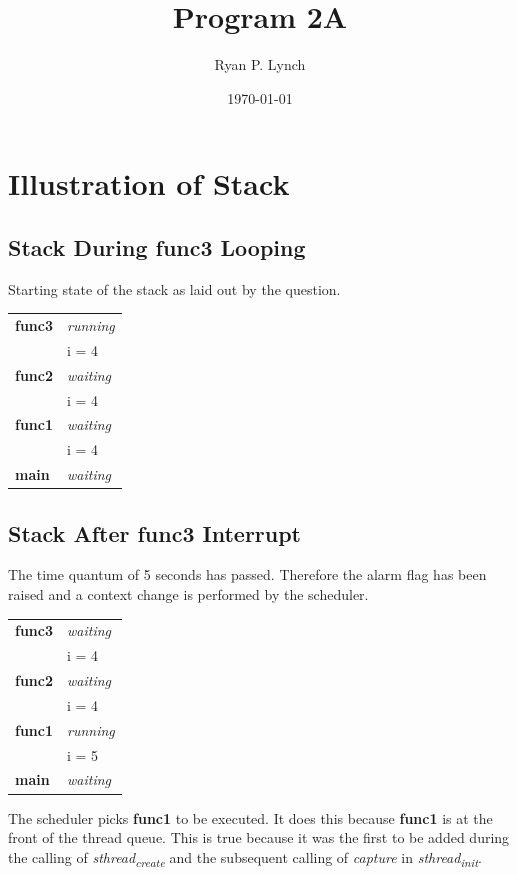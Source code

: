 \documentclass[a4paper,11pt,twoside]{article}
\author{Ryan P. Lynch}
\date{\today}
\title{Program 2A}
\begin{document}
\maketitle

\section*{Illustration of Stack}
\label{sec:org5f53a83}
\subsection*{Stack During func3 Looping}
\label{sec:orgdbb2187}
Starting state of the stack as laid out by the question.
\begin{center}
\begin{tabular}{ll}
\hline
\textbf{func3} & \emph{running}\\[0pt]
 & i = 4\\[0pt]
\hline
\textbf{func2} & \emph{waiting}\\[0pt]
 & i = 4\\[0pt]
\hline
\textbf{func1} & \emph{waiting}\\[0pt]
 & i = 4\\[0pt]
\hline
\textbf{main} & \emph{waiting}\\[0pt]
\hline
\end{tabular}
\end{center}

\subsection*{Stack After func3 Interrupt}
\label{sec:org95e0abc}
The time quantum of 5 seconds has passed. Therefore the alarm flag has been raised and a context change is performed by the scheduler.
\begin{center}
\begin{tabular}{ll}
\hline
\textbf{func3} & \emph{waiting}\\[0pt]
 & i = 4\\[0pt]
\hline
\textbf{func2} & \emph{waiting}\\[0pt]
 & i = 4\\[0pt]
\hline
\textbf{func1} & \emph{running}\\[0pt]
 & i = 5\\[0pt]
\hline
\textbf{main} & \emph{waiting}\\[0pt]
\hline
\end{tabular}
\end{center}
The scheduler picks \textbf{func1} to be executed. It does this because \textbf{func1} is at the front of the thread queue. This is true because it was the first to be added during the calling of \emph{sthread\textsubscript{create}} and the subsequent calling of \emph{capture} in \emph{sthread\textsubscript{init}}.
\pagebreak
\end{document}
